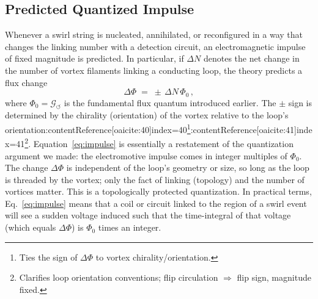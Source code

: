 \documentclass[12pt]{article}
\begin{document}
    \subsection{Predicted Quantized Impulse}\label{sec:prediction}
        Whenever a swirl string is nucleated, annihilated, or reconfigured in a way that changes the linking number with a detection circuit, an electromagnetic impulse of fixed magnitude is predicted. In particular, if $\Delta N$ denotes the net change in the number of vortex filaments linking a conducting loop, the theory predicts a flux change
        \begin{equation}\label{eq:impulse}
        \Delta \Phi \;=\; \pm\,\Delta N\,\Phi_{0}\,,
        \end{equation}
        where $\Phi_{0} = \mathcal{G}_{\!\boldsymbol{\circlearrowleft}}$ is the fundamental flux quantum introduced earlier. The $\pm$ sign is determined by the chirality (orientation) of the vortex relative to the loop’s orientation:contentReference[oaicite:40]{index=40}\footnote{Ties the sign of $\Delta\Phi$ to vortex chirality/orientation.}:contentReference[oaicite:41]{index=41}\footnote{Clarifies loop orientation conventions; flip circulation $\Rightarrow$ flip sign, magnitude fixed.}. Equation~\eqref{eq:impulse} is essentially a restatement of the quantization argument we made: the electromotive impulse comes in integer multiples of $\Phi_{0}$. The change $\Delta \Phi$ is independent of the loop's geometry or size, so long as the loop is threaded by the vortex; only the fact of linking (topology) and the number of vortices matter. This is a topologically protected quantization. In practical terms, Eq.~\eqref{eq:impulse} means that a coil or circuit linked to the region of a swirl event will see a sudden voltage induced such that the time-integral of that voltage (which equals $\Delta \Phi$) is $\Phi_{0}$ times an integer.
\end{document}
